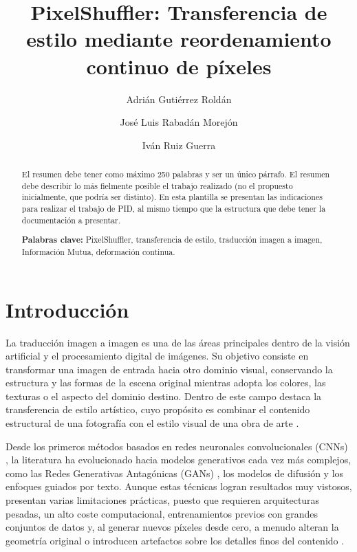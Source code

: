 \documentclass[a4paper]{article}
\title{PixelShuffler: Transferencia de estilo mediante reordenamiento continuo de píxeles}
\author{Adrián Gutiérrez Roldán \and José Luis Rabadán Morejón \and Iván Ruiz Guerra}
\begin{document}
\maketitle

\begin{abstract}
 \noindent El resumen debe tener como máximo 250 palabras y ser un único párrafo. El resumen debe describir lo más fielmente posible el trabajo realizado (no el propuesto inicialmente, que podría ser distinto). 
 En esta plantilla se presentan las indicaciones para realizar el trabajo de PID, al mismo tiempo que la estructura que debe tener la documentación a presentar. 

\hspace{1cm}

\noindent \textbf{Palabras clave:} 
PixelShuffler, transferencia de estilo, traducción imagen a imagen, Información Mutua, deformación continua.
\end{abstract}


\section{Introducción}

\noindent La traducción imagen a imagen es una de las áreas principales dentro de la visión artificial y el procesamiento digital de imágenes. Su objetivo consiste en transformar una imagen de entrada hacia otro dominio visual, conservando la estructura y las formas de la escena original mientras adopta los colores, las texturas o el aspecto del dominio destino. Dentro de este campo destaca la transferencia de estilo artístico, cuyo propósito es combinar el contenido estructural de una fotografía con el estilo visual de una obra de arte \cite{gatys2015neural}.

\vspace{0.3cm}

\noindent Desde los primeros métodos basados en redes neuronales convolucionales (CNNs) \cite{gatys2015neural}, la literatura ha evolucionado hacia modelos generativos cada vez más complejos, como las Redes Generativas Antagónicas (GANs) \cite{zhu2017unpaired}, los modelos de difusión \cite{chung2024style} y los enfoques guiados por texto. Aunque estas técnicas logran resultados muy vistosos, presentan varias limitaciones prácticas, puesto que requieren arquitecturas pesadas, un alto coste computacional, entrenamientos previos con grandes conjuntos de datos y, al generar nuevos píxeles desde cero, a menudo alteran la geometría original o introducen artefactos sobre los detalles finos del contenido \cite{zamzam2025pixelshuffler}.
\end{document}
